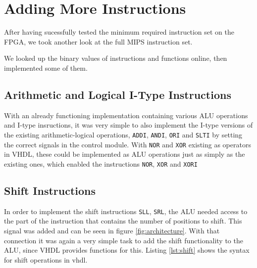 \section{Adding More Instructions}
\label{sec:more_instructions}
After having sucessfully tested the minimum required instruction set on the FPGA,
we took another look at the full MIPS instruction set.

We looked up the binary values of instructions and functions online\cite{bib:opencores},
then implemented some of them.

\subsection{Arithmetic and Logical I-Type Instructions}
With an already functioning implementation containing various ALU operations and I-type insructions,
it was very simple to also implement the I-type versions of the existing arithmetic-logical operations, \texttt{ADDI}, \texttt{ANDI}, \texttt{ORI} and \texttt{SLTI} by setting the correct signals in the control module.
With \texttt{NOR} and \texttt{XOR} existing as operators in VHDL, these could be implemented as ALU operations just as simply as the existing ones,
which enabled the instructions \texttt{NOR}, \texttt{XOR} and \texttt{XORI}

\subsection{Shift Instructions}
In order to implement the shift instructions \texttt{SLL}, \texttt{SRL},
the ALU needed access to the part of the instruction that contains the number of positions to shift.
This signal was added and can be seen in figure \ref{fig:architecture}.
With that connection it was again a very simple task to add the shift functionality to the ALU, since VHDL provides functions for this.
Listing \ref{lst:shift} shows the syntax for shift operations in \gls{vhdl}.

